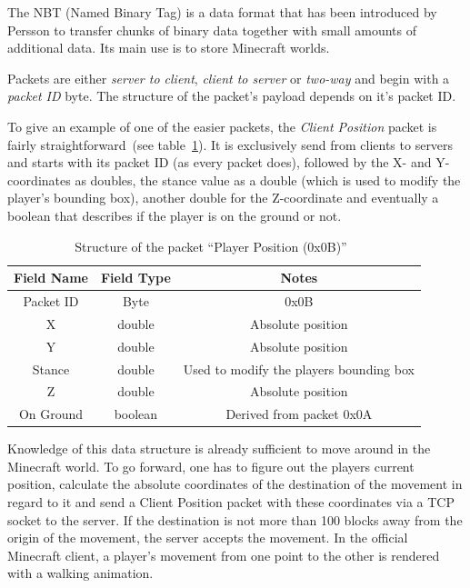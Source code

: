 The NBT (Named Binary Tag) is a data format that has been introduced by Persson to transfer chunks of binary data together with small amounts of additional data. Its main use is to store Minecraft worlds.

Packets are either \emph{server to client}, \emph{client to server} or \emph{two-way} and begin with a \emph{packet ID} byte. The structure of the packet's payload depends on it's packet ID.
 
To give an example of one of the easier packets, the \emph{Client Position} packet is fairly straightforward~(see table~\ref{mc_packet}). It is exclusively send from clients to servers and starts with its packet ID (as every packet does), followed by the X- and Y-coordinates as doubles, the stance value as a double (which is used to modify the player's bounding box), another double for the Z-coordinate and eventually a boolean that describes if the player is on the ground or not.~\cite{protocol}

\begin{table}[htb]
\centering
\begin{tabular}{|c|c|c|}\hline

    Field Name & Field Type & Notes \\ \hline
   Packet ID & Byte & 0x0B \\ \hline
   X & double & Absolute position \\ \hline
   Y & double & Absolute position \\ \hline
   Stance & double & Used to modify the players bounding box \\ \hline
   Z & double & Absolute position \\ \hline
   On Ground & boolean & Derived from packet 0x0A \\ \hline
   
\end{tabular}
\caption{Structure of the packet ``Player Position (0x0B)''~\cite{protocol}}
\label{mc_packet}
\end{table}

Knowledge of this data structure is already sufficient to move around in the Minecraft world. To go forward, one has to figure out the players current position, calculate the absolute coordinates of the destination of the movement in regard to it and send a Client Position packet with these coordinates via a TCP socket to the server. If the destination is not more than 100 blocks away from the origin of the movement, the server accepts the movement. In the official Minecraft client, a player's movement from one point to the other is rendered with a walking animation.

